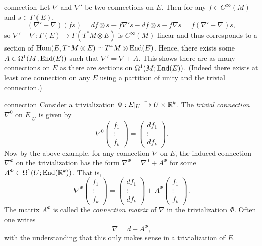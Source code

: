 \begin{example}{connection}
    Let $\nabla$ and $\nabla'$ be two connections on $E$. Then for any $f \in C^\infty(M)$ and $s \in \Gamma(E)$,
    \[ (\nabla' - \nabla) (fs) = df \otimes s + f \nabla' s - df \otimes s - f \nabla s = f(\nabla' - \nabla) s , \]
    so $\nabla' - \nabla : \Gamma(E) \to \Gamma(T^*M \otimes E)$ is $C^\infty(M)$-linear and thus corresponds to a section of $\text{Hom}(E, T^*M \otimes E) \simeq T^*M \otimes \textup{End}(E)$. Hence, there exists some $A \in \Omega^1(M; \textup{End}(E))$ such that $\nabla' = \nabla + A$. This shows there are as many connections on $E$ as there are sections on $\Omega^1(M; \textup{End}(E))$. (Indeed there exists at least one connection on any $E$ using a partition of unity and the trivial connection.)
\end{example}

\begin{example}{connection}
    Consider a trivialization $\Phi : E|_U \xrightarrow{\sim} U \times \mathbb{R}^k$. The \textit{trivial connection} $\nabla^0$ on $E|_U$ is given by
    \[ \nabla^0 \begin{pmatrix} f_1 \\ \vdots \\ f_k \end{pmatrix} = \begin{pmatrix} df_1 \\ \vdots \\ df_k \end{pmatrix} . \]
    Now by the above example, for any connection $\nabla$ on $E$, the induced connection $\nabla^\Phi$ on the trivialization has the form $\nabla^\Phi = \nabla^0 + A^\Phi$ for some $A^\Phi \in \Omega^1(U; \textup{End}(\mathbb{R}^k))$. That is,
    \[ \nabla^\Phi \begin{pmatrix} f_1 \\ \vdots \\ f_k \end{pmatrix} = \begin{pmatrix} df_1 \\ \vdots \\ df_k \end{pmatrix} + A^\Phi \begin{pmatrix} f_1 \\ \vdots \\ f_k \end{pmatrix} . \]
    The matrix $A^\Phi$ is called the \textit{connection matrix} of $\nabla$ in the trivialization $\Phi$. Often one writes \[ \nabla = d + A^\Phi , \]
    with the understanding that this only makes sense in a trivialization of $E$.
\end{example}

